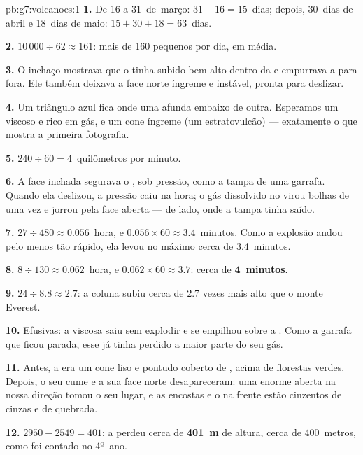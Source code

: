 \begin{solution}{pb:g7:volcanoes:1}
\textbf{1.} De 16 a 31~de~março: $31 - 16 = 15$~dias; depois, 30~dias de
abril e 18~dias de maio: $15 + 30 + 18 = 63$~dias.

\textbf{2.} $10\,000 \div 62 \approx 161$: mais de 160 pequenos 
por dia, em média.

\textbf{3.} O inchaço mostrava que o  tinha subido bem alto dentro da
 e empurrava a  para fora. Ele também deixava a face norte
íngreme e instável, pronta para deslizar.

\textbf{4.} Um triângulo azul fica onde uma  afunda embaixo de outra.
Esperamos um  viscoso e rico em gás,  e um cone
íngreme (um estratovulcão) --- exatamente o que mostra a primeira
fotografia.

\textbf{5.} $240 \div 60 = 4$~quilômetros por minuto.

\textbf{6.} A face inchada segurava o , sob pressão, como a tampa de
uma garrafa. Quando ela deslizou, a pressão caiu na hora; o gás dissolvido
no  virou bolhas de uma vez e jorrou pela face aberta --- de lado,
onde a tampa tinha saído.

\textbf{7.} $27 \div 480 \approx 0.056$~hora, e $0.056 \times 60 \approx
3.4$~minutos. Como a explosão andou pelo menos tão rápido, ela levou no
máximo cerca de 3.4~minutos.

\textbf{8.} $8 \div 130 \approx 0.062$~hora, e $0.062 \times 60 \approx
3.7$: cerca de \textbf{4~minutos}.

\textbf{9.} $24 \div 8.8 \approx 2.7$: a coluna subiu cerca de 2.7 vezes
mais alto que o monte Everest.

\textbf{10.} Efusivas: a  viscosa saiu sem explodir e se empilhou sobre
a . Como a garrafa que ficou parada, esse  já tinha perdido a
maior parte do seu gás.

\textbf{11.} Antes, a  era um cone liso e pontudo coberto de ,
acima de florestas verdes. Depois, o seu cume e a sua face norte
desapareceram: uma  enorme aberta na nossa direção tomou o seu
lugar, e as encostas e o  na frente estão cinzentos de cinzas e de
 quebrada.

\textbf{12.} $2950 - 2549 = 401$: a  perdeu cerca de
\textbf{401~m} de altura, cerca de 400~metros, como foi contado no 4º~ano.
\end{solution}
